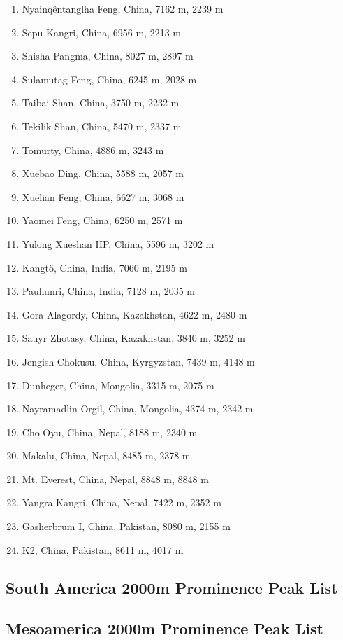 \documentclass[10pt,twocolumn,letterpaper]{article}
\begin{document}
\begin{flushleft}
\begin{enumerate}
    \item Nyainqêntanglha Feng, China, 7162 m, 2239 m
    \item Sepu Kangri, China, 6956 m, 2213 m
    \item Shisha Pangma, China, 8027 m, 2897 m
    \item Sulamutag Feng, China, 6245 m, 2028 m
    \item Taibai Shan, China, 3750 m, 2232 m
    \item Tekilik Shan, China, 5470 m, 2337 m
    \item Tomurty, China, 4886 m, 3243 m
    \item Xuebao Ding, China, 5588 m, 2057 m
    \item Xuelian Feng, China, 6627 m, 3068 m
    \item Yaomei Feng, China, 6250 m, 2571 m
    \item Yulong Xueshan HP, China, 5596 m, 3202 m
    \item Kangtö, China, India, 7060 m, 2195 m
    \item Pauhunri, China, India, 7128 m, 2035 m
    \item Gora Alagordy, China, Kazakhstan, 4622 m, 2480 m
    \item Sauyr Zhotasy, China, Kazakhstan, 3840 m, 3252 m
    \item Jengish Chokusu, China, Kyrgyzstan, 7439 m, 4148 m
    \item Dunheger, China, Mongolia, 3315 m, 2075 m
    \item Nayramadlin Orgil, China, Mongolia, 4374 m, 2342 m
    \item Cho Oyu, China, Nepal, 8188 m, 2340 m
    \item Makalu, China, Nepal, 8485 m, 2378 m
    \item Mt. Everest, China, Nepal, 8848 m, 8848 m
    \item Yangra Kangri, China, Nepal, 7422 m, 2352 m
    \item Gasherbrum I, China, Pakistan, 8080 m, 2155 m
    \item K2, China, Pakistan, 8611 m, 4017 m
\end{enumerate}
\end{flushleft}

\subsection{South America 2000m Prominence Peak List}

\subsection{Mesoamerica 2000m Prominence Peak List}
\end{document}
